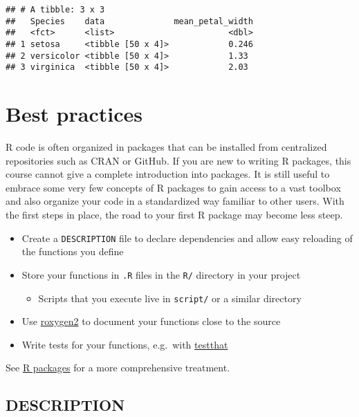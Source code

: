 \documentclass[]{book}
\providecommand{\tightlist}{%
  \setlength{\itemsep}{0pt}\setlength{\parskip}{0pt}}
\begin{document}
\begin{verbatim}
## # A tibble: 3 x 3
##   Species    data              mean_petal_width
##   <fct>      <list>                       <dbl>
## 1 setosa     <tibble [50 x 4]>            0.246
## 2 versicolor <tibble [50 x 4]>            1.33 
## 3 virginica  <tibble [50 x 4]>            2.03
\end{verbatim}

\hypertarget{best-practices}{%
\chapter{Best practices}\label{best-practices}}

R code is often organized in packages that can be installed from centralized repositories such as CRAN or GitHub.
If you are new to writing R packages, this course cannot give a complete introduction into packages.
It is still useful to embrace some very few concepts of R packages to gain access to a vast toolbox and also organize your code in a standardized way familiar to other users.
With the first steps in place, the road to your first R package may become less steep.

\begin{itemize}
\tightlist
\item
  Create a \texttt{DESCRIPTION} file to declare dependencies and allow easy reloading of the functions you define
\item
  Store your functions in \texttt{.R} files in the \texttt{R/} directory in your project

  \begin{itemize}
  \tightlist
  \item
    Scripts that you execute live in \texttt{script/} or a similar directory
  \end{itemize}
\item
  Use \href{https://github.com/klutometis/roxygen}{roxygen2} to document your functions close to the source
\item
  Write tests for your functions, e.g.~with \href{https://testthat.r-lib.org/}{testthat}
\end{itemize}

See \href{http://r-pkgs.had.co.nz/}{R packages} for a more comprehensive treatment.

\hypertarget{description}{%
\section{DESCRIPTION}\label{description}}
\end{document}
